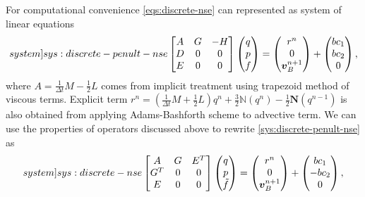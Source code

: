 \documentclass{article}
\numberwithin{equation}{section}
\begin{document}
For computational convenience \cref{eqs:discrete-nse} can represented as system of linear equations
\begin{equation}\label[system]{sys:discrete-penult-nse}
	\begin{bmatrix}{}
  A & G & -H \\
  D& 0& 0\\
  E & 0 & 0
\end{bmatrix}
\begin{pmatrix}{}
	q \\
	p \\
  	f
\end{pmatrix}=
\begin{pmatrix}{}
	r^{n} \\
	0 \\
  	\boldsymbol{v}_B^{n+1}
\end{pmatrix}
+\begin{pmatrix}{}
	bc_1 \\
	bc_2 \\
  	0
\end{pmatrix},
\end{equation}
where $A = \frac{1}{\Delta t} M - \frac{1}{2} L$ comes from implicit treatment using trapezoid method of viscous terms. Explicit term $r^n=\left( \frac{1}{\Delta t}M + \frac{1}{2} L\right)q^n + \frac{3}{2}\mathbb{N}(q^n) - \frac{1}{2}\mathbf{N}(q^{n-1})$ is also obtained from applying Adams-Bashforth scheme to advective term. We can use the properties of operators discussed above to rewrite \cref{sys:discrete-penult-nse} as 
\begin{equation}\label[system]{sys:discrete-nse}
	\begin{bmatrix}{}
  A & G & E^T \\
  G^T& 0& 0\\
  E & 0 & 0
\end{bmatrix}
\begin{pmatrix}{}
	q \\
	p \\
  	\tilde{f}
\end{pmatrix}=
\begin{pmatrix}{}
	r^{n} \\
	0 \\
  	\boldsymbol{v}_B^{n+1}
\end{pmatrix}
+\begin{pmatrix}{}
	bc_1 \\
	-bc_2 \\
  	0
\end{pmatrix},
\end{equation}
\end{document}
